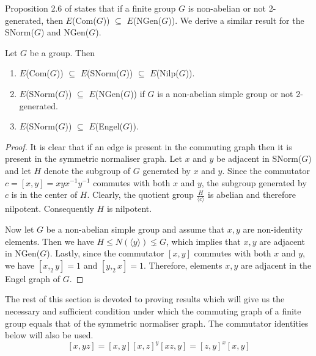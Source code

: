 \setcounter{thm}{0}
\par
Proposition 2.6 of \cite{PJC2022} states that if a finite group $G$ is non-abelian or not 2-generated, then $E$(Com($G$)) $\subseteq$ $E$(NGen($G$)). We derive a similar result for the SNorm($G$) and NGen($G$).
\begin{thm}\label{Hierarchy} 
    Let $G$ be a group. Then
    \begin{enumerate}[{\rm (i)}]
        \item $E$\rm{(Com(}$G$\rm{))} $\subseteq$ $E$\rm{(SNorm(}$G$\rm{))} $\subseteq$ $E$\rm{(Nilp(}$G$\rm{))}.
        \item  $E$\rm{(SNorm(}$G$\rm{))} $\subseteq$ $E$\rm{(NGen(}$G$\rm{))} if $G$ is a non-abelian simple group or not 2-generated. 
        \item $E$\rm{(SNorm(}$G$\rm{))} $\subseteq$ $E$\rm{(Engel(}$G$\rm{))}.
    \end{enumerate}
\end{thm}
\begin{proof}
It is clear that if an edge is present in the commuting graph then it is present in the symmetric normaliser graph. Let $x$ and $y$ be adjacent in SNorm($G$) and let $H$ denote the subgroup of $G$ generated by $x$ and $y$. Since the commutator $c = [x,y] = xyx^{-1}y^{-1}$ commutes with both $x$ and $y$, the subgroup generated by $c$ is in the center of $H$. Clearly, the quotient group $\frac{H}{\langle c \rangle}$ is abelian and therefore nilpotent. Consequently $H$ is nilpotent.

Now let $G$ be a non-abelian simple group and assume that $x,y$ are non-identity elements.  Then we have $H \leq N(\langle y \rangle) \lneq G$, which implies that $x,y$ are adjacent in NGen($G$). Lastly, since the commutator $[x, y]$ commutes with both $x$ and $y$, we have $[x,_2 y ] = 1$ and $[y ,_2 x] =1$. Therefore, elements $x,y$ are adjacent in the Engel graph of $G$.
\end{proof}

The rest of this section is devoted to proving results which will give us the necessary and sufficient condition under which the commuting graph of a finite group equals that of the symmetric normaliser graph. The commutator identities below will also be used.
\begin{subequations}
\begin{equation}
\label{comu_id_1}
[x,yz] =[x,y][x,z]^y
\end{equation}
\begin{equation}
\label{comu_id_2}
 [xz,y] = [z,y]^x[x,y]
 \end{equation}
\end{subequations}

